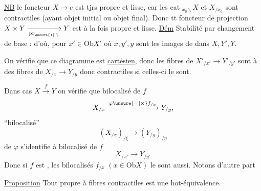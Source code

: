  \uline{NB} le foncteur $X\to e$ est tjrs propre et lisse, car les cat ${}_{x_0\backslash}X$ et $X_{/x_0}$ sont contractiles (ayant objet initial ou objet final). Donc tt foncteur de projection $X\times Y\xrightarrow[\mathrm{pr}_{\unsure{1|,}}]{}Y$ est à la fois propre et lisse.
\uline{Dém} Stabilité par changement de base :
d'où, pour $x'\in\mathrm{Ob}X'$
où $x,y',y$ sont les images de  dans $X,Y',Y$.

On vérifie que ce diagramme est \uline{cartésien}, donc les fibres de $X'_{/x'}\longrightarrow Y'_{/y'}$ sont  à des fibres de $X_{/x}\to Y_{/y}$ donc contractiles si celles-ci le sont.

Dans  cas $X\xrightarrow{f}Y$ on vérifie que    bilocalisé de $f$
\[
 X_{/x}\xrightarrow{\varphi\unsure{=|\times}f_{/x}}Y_{/y},
\]
  ``bilocalisé''
\[
 (X_{/x})_{/\xi}\longrightarrow(Y_{/y})_{/\eta}
\]
 de $\varphi$ s'identifie  à  bilocalisé de $f$
\[
 X_{/x'}\longrightarrow Y_{/y'}
\]
Donc si $f$ est  , les bilocalisés $f_{/x}$ $(x\in\mathrm{Ob}X)$ le sont aussi. Notons d'autre part

\uline{Proposition} Tout  propre  à fibres contractiles est une hot-équivalence.

